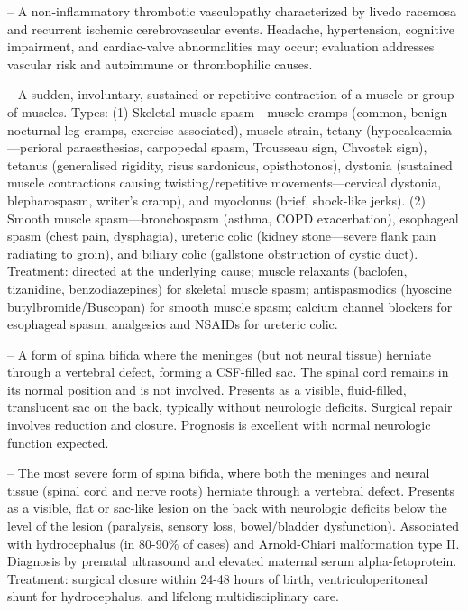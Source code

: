 -- A non-inflammatory thrombotic vasculopathy characterized by livedo racemosa and recurrent ischemic cerebrovascular events. Headache, hypertension, cognitive impairment, and cardiac-valve abnormalities may occur; evaluation addresses vascular risk and autoimmune or thrombophilic causes.

-- A sudden, involuntary, sustained or repetitive contraction of a muscle or group of muscles. Types: (1) Skeletal muscle spasm—muscle cramps (common, benign—nocturnal leg cramps, exercise-associated), muscle strain, tetany (hypocalcaemia—perioral paraesthesias, carpopedal spasm, Trousseau sign, Chvostek sign), tetanus (generalised rigidity, risus sardonicus, opisthotonos), dystonia (sustained muscle contractions causing twisting/repetitive movements—cervical dystonia, blepharospasm, writer's cramp), and myoclonus (brief, shock-like jerks). (2) Smooth muscle spasm—bronchospasm (asthma, COPD exacerbation), esophageal spasm (chest pain, dysphagia), ureteric colic (kidney stone—severe flank pain radiating to groin), and biliary colic (gallstone obstruction of cystic duct). Treatment: directed at the underlying cause; muscle relaxants (baclofen, tizanidine, benzodiazepines) for skeletal muscle spasm; antispasmodics (hyoscine butylbromide/Buscopan) for smooth muscle spasm; calcium channel blockers for esophageal spasm; analgesics and NSAIDs for ureteric colic.

-- A form of spina bifida where the meninges (but not neural tissue) herniate through a vertebral defect, forming a CSF-filled sac. The spinal cord remains in its normal position and is not involved. Presents as a visible, fluid-filled, translucent sac on the back, typically without neurologic deficits. Surgical repair involves reduction and closure. Prognosis is excellent with normal neurologic function expected.

-- The most severe form of spina bifida, where both the meninges and neural tissue (spinal cord and nerve roots) herniate through a vertebral defect. Presents as a visible, flat or sac-like lesion on the back with neurologic deficits below the level of the lesion (paralysis, sensory loss, bowel/bladder dysfunction). Associated with hydrocephalus (in 80-90\% of cases) and Arnold-Chiari malformation type II. Diagnosis by prenatal ultrasound and elevated maternal serum alpha-fetoprotein. Treatment: surgical closure within 24-48 hours of birth, ventriculoperitoneal shunt for hydrocephalus, and lifelong multidisciplinary care.

